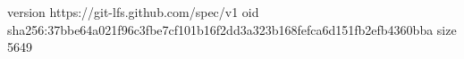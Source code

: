 version https://git-lfs.github.com/spec/v1
oid sha256:37bbe64a021f96c3fbe7cf101b16f2dd3a323b168fefca6d151fb2efb4360bba
size 5649
